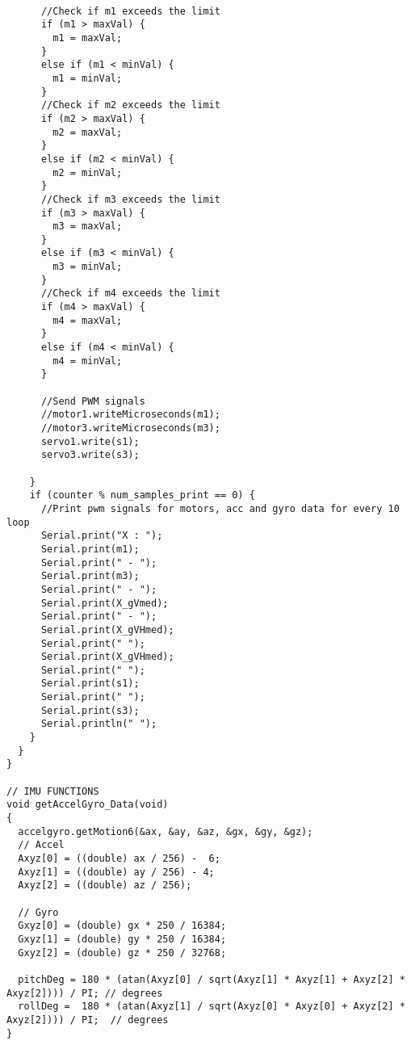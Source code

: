 \begin{lstlisting}
 
      //Check if m1 exceeds the limit
      if (m1 > maxVal) {
        m1 = maxVal;
      }
      else if (m1 < minVal) {
        m1 = minVal;
      }
      //Check if m2 exceeds the limit
      if (m2 > maxVal) {
        m2 = maxVal;
      }
      else if (m2 < minVal) {
        m2 = minVal;
      }
      //Check if m3 exceeds the limit
      if (m3 > maxVal) {
        m3 = maxVal;
      }
      else if (m3 < minVal) {
        m3 = minVal;
      }
      //Check if m4 exceeds the limit
      if (m4 > maxVal) {
        m4 = maxVal;
      }
      else if (m4 < minVal) {
        m4 = minVal;
      }
 
      //Send PWM signals
      //motor1.writeMicroseconds(m1);
      //motor3.writeMicroseconds(m3);
      servo1.write(s1);
      servo3.write(s3);
 
    }
    if (counter % num_samples_print == 0) {
      //Print pwm signals for motors, acc and gyro data for every 10 loop
      Serial.print("X : ");
      Serial.print(m1);
      Serial.print(" - ");
      Serial.print(m3);
      Serial.print(" - ");
      Serial.print(X_gVmed);
      Serial.print(" - ");
      Serial.print(X_gVHmed);
      Serial.print(" ");
      Serial.print(X_gVHmed);
      Serial.print(" ");
      Serial.print(s1);
      Serial.print(" ");
      Serial.print(s3);
      Serial.println(" ");
    }
  }
}
 
// IMU FUNCTIONS
void getAccelGyro_Data(void)
{
  accelgyro.getMotion6(&ax, &ay, &az, &gx, &gy, &gz);
  // Accel
  Axyz[0] = ((double) ax / 256) -  6;
  Axyz[1] = ((double) ay / 256) - 4;
  Axyz[2] = ((double) az / 256);
 
  // Gyro
  Gxyz[0] = (double) gx * 250 / 16384;
  Gxyz[1] = (double) gy * 250 / 16384;
  Gxyz[2] = (double) gz * 250 / 32768;
 
  pitchDeg = 180 * (atan(Axyz[0] / sqrt(Axyz[1] * Axyz[1] + Axyz[2] * Axyz[2]))) / PI; // degrees
  rollDeg =  180 * (atan(Axyz[1] / sqrt(Axyz[0] * Axyz[0] + Axyz[2] * Axyz[2]))) / PI;  // degrees
}
\end{lstlisting}